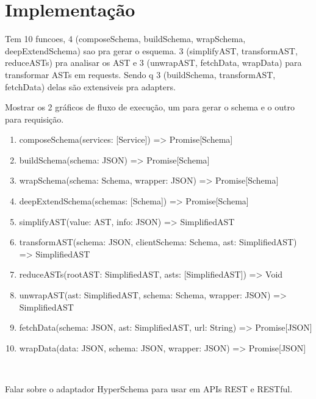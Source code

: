 \section{Implementação}

Tem 10 funcoes, 4 (composeSchema, buildSchema, wrapSchema, deepExtendSchema) sao pra gerar o esquema. 3 (simplifyAST, transformAST, reduceASTs) pra analisar os AST e 3 (unwrapAST, fetchData, wrapData) para transformar ASTs em requests. Sendo q 3 (buildSchema, transformAST, fetchData) delas são extensiveis pra adapters.

Mostrar os 2 gráficos de fluxo de execução, um para gerar o schema e o outro para requisição.

\begin{enumerate}
\item composeSchema(services: [Service]) => Promise[Schema]
\item buildSchema(schema: JSON) => Promise[Schema]
\item wrapSchema(schema: Schema, wrapper: JSON) => Promise[Schema]
\item deepExtendSchema(schemas: [Schema]) => Promise[Schema]
\item simplifyAST(value: AST, info: JSON) => SimplifiedAST
\item transformAST(schema: JSON, clientSchema: Schema, ast: SimplifiedAST) => SimplifiedAST
\item reduceASTs(rootAST: SimplifiedAST, asts: [SimplifiedAST]) => Void
\item unwrapAST(ast: SimplifiedAST, schema: Schema, wrapper: JSON) => SimplifiedAST
\item fetchData(schema: JSON, ast: SimplifiedAST, url: String) => Promise[JSON]
\item wrapData(data: JSON, schema: JSON, wrapper: JSON) => Promise[JSON]
\end{enumerate}

\

Falar sobre o adaptador HyperSchema para usar em APIs REST e RESTful.
